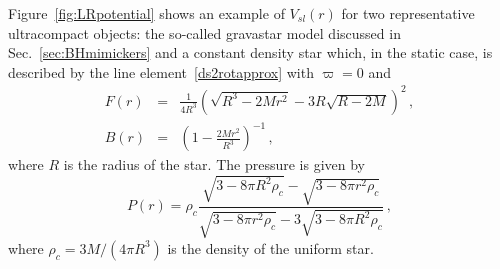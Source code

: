\documentclass[11pt]{article}
\numberwithin{equation}{section} %
\begin{document}
Figure~\ref{fig:LRpotential} shows an example of $V_{sl}(r)$ for two representative ultracompact objects: the so-called gravastar model discussed in Sec.~\ref{sec:BHmimickers} and a constant density star which, in the static case, is described by the line element~\eqref{ds2rotapprox} with $\varpi=0$ and
%
\begin{eqnarray}
F(r)&=&\frac{1}{4 R^3}\left(\sqrt{R^3-2Mr^2}-3R\sqrt{R-2M}\right)^2\,, \label{fstar}\\
B(r)&=&\left(1-\frac{2 M r^2}{R^3}\right)^{-1}\,, \label{Bstar}
\end{eqnarray}
%
where $R$ is the radius of the star. The pressure is given by
\begin{equation}
 P(r)=\rho_c\frac{\sqrt{3-8 \pi  R^2 \rho_c}-\sqrt{3-8 \pi  r^2 \rho_c}}{\sqrt{3-8 \pi  r^2 \rho_c}-3 \sqrt{3-8 \pi  R^2 \rho_c}}\,, \label{Pstar}
\end{equation}
where $\rho_c=3M/(4\pi R^3)$ is the density of the uniform star.
\end{document}
